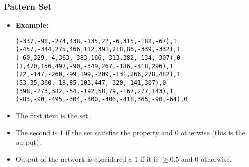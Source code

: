 \documentclass{beamer}
\numberwithin{equation}{section} %
\begin{document}
\begin{frame}
    \frametitle{Pattern Set}
    \begin{itemize}
        \item \textbf{Example:}
        \footnotesize
        \begin{alltt}
        (-337, -98, -274, 438, -135, 22, -6, 315, -188, -67), 1\\
        (-457, -344, 275, 466, 112, 391, 218, 86, -339, -332), 1\\
        (-60, 329, -4, 363, -383, 166, -313, 382, -134, -307), 0\\
        (1, 470, 156, 497, -90, -349, 267, -186, -418, 296), 1\\
        (22, -147, -260, -99, 199, -209, -131, 266, 278, 482), 1\\
        (53, 35, 360, -18, 85, 103, 447, -320, -141, 307), 0\\
        (398, -273, 382, -54, -192, 58, 79, -167, 277, 143), 1\\
        (-83, -90, -495, -304, -300, -406, -418, 365, -90, -64), 0
        \end{alltt}
        \normalsize
        \pause
        \item The first item is the set.
        \item The second is 1 if the set satisfies the property and 0 otherwise (this is the output).
        \pause
        \item Output of the network is considered a 1 if it is $\geq 0.5$ and 0 otherwise.
    \end{itemize}
\end{frame}
\end{document}
